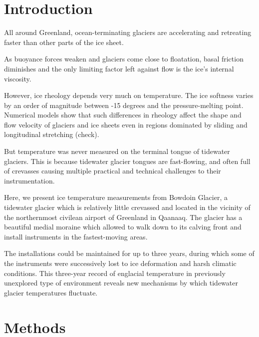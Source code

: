 \documentclass[utf8]{article}
\begin{document}
\section{Introduction}

    All around Greenland, ocean-terminating glaciers are accelerating and
    retreating faster than other parts of the ice sheet.

    As buoyance forces weaken and glaciers come close to floatation, basal
    friction diminishes and the only limiting factor left against flow is the
    ice's internal viscosity.

    However, ice rheology depends very much on temperature. The ice softness
    varies by an order of magnitude between -15 degrees and the
    pressure-melting point. Numerical models show that such differences in
    rheology affect the shape and flow velocity of glaciers and ice sheets even
    in regions dominated by sliding and longitudinal stretching (check).

    But temperature was never measured on the terminal tongue of tidewater
    glaciers. This is because tidewater glacier tongues are fast-flowing,
    and often full of crevasses causing multiple practical and technical
    challenges to their instrumentation.

    Here, we present ice temperature measurements from Bowdoin Glacier, a
    tidewater glacier which is relatively little crevassed and located in the
    vicinity of the northernmost civilean airport of Greenland in Qaanaaq. The
    glacier has a beautiful medial moraine which allowed to walk down to its
    calving front and install instruments in the fastest-moving areas.

    The installations could be maintained for up to three years, during which
    some of the instruments were successively lost to ice deformation and harsh
    climatic conditions. This three-year record of englacial temperature in
    previously unexplored type of environment reveals new mechanisms by which
    tidewater glacier temperatures fluctuate.


\section{Methods}
\end{document}
